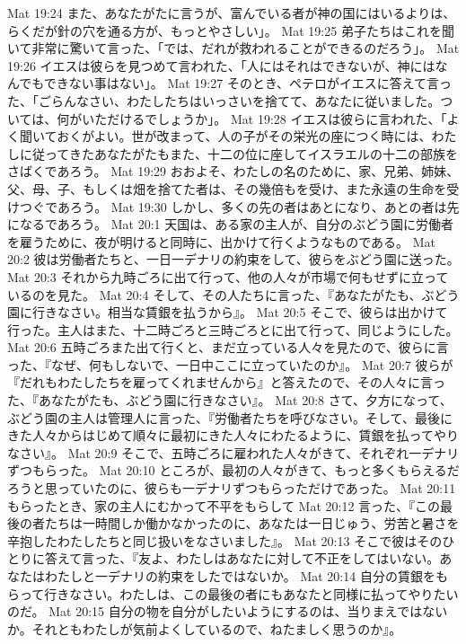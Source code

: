 Mat 19:24  また、あなたがたに言うが、富んでいる者が神の国にはいるよりは、らくだが針の穴を通る方が、もっとやさしい」。
Mat 19:25  弟子たちはこれを聞いて非常に驚いて言った、「では、だれが救われることができるのだろう」。
Mat 19:26  イエスは彼らを見つめて言われた、「人にはそれはできないが、神にはなんでもできない事はない」。
Mat 19:27  そのとき、ペテロがイエスに答えて言った、「ごらんなさい、わたしたちはいっさいを捨てて、あなたに従いました。ついては、何がいただけるでしょうか」。
Mat 19:28  イエスは彼らに言われた、「よく聞いておくがよい。世が改まって、人の子がその栄光の座につく時には、わたしに従ってきたあなたがたもまた、十二の位に座してイスラエルの十二の部族をさばくであろう。
Mat 19:29  おおよそ、わたしの名のために、家、兄弟、姉妹、父、母、子、もしくは畑を捨てた者は、その幾倍もを受け、また永遠の生命を受けつぐであろう。
Mat 19:30  しかし、多くの先の者はあとになり、あとの者は先になるであろう。
Mat 20:1  天国は、ある家の主人が、自分のぶどう園に労働者を雇うために、夜が明けると同時に、出かけて行くようなものである。
Mat 20:2  彼は労働者たちと、一日一デナリの約束をして、彼らをぶどう園に送った。
Mat 20:3  それから九時ごろに出て行って、他の人々が市場で何もせずに立っているのを見た。
Mat 20:4  そして、その人たちに言った、『あなたがたも、ぶどう園に行きなさい。相当な賃銀を払うから』。
Mat 20:5  そこで、彼らは出かけて行った。主人はまた、十二時ごろと三時ごろとに出て行って、同じようにした。
Mat 20:6  五時ごろまた出て行くと、まだ立っている人々を見たので、彼らに言った、『なぜ、何もしないで、一日中ここに立っていたのか』。
Mat 20:7  彼らが『だれもわたしたちを雇ってくれませんから』と答えたので、その人々に言った、『あなたがたも、ぶどう園に行きなさい』。
Mat 20:8  さて、夕方になって、ぶどう園の主人は管理人に言った、『労働者たちを呼びなさい。そして、最後にきた人々からはじめて順々に最初にきた人々にわたるように、賃銀を払ってやりなさい』。
Mat 20:9  そこで、五時ごろに雇われた人々がきて、それぞれ一デナリずつもらった。
Mat 20:10  ところが、最初の人々がきて、もっと多くもらえるだろうと思っていたのに、彼らも一デナリずつもらっただけであった。
Mat 20:11  もらったとき、家の主人にむかって不平をもらして
Mat 20:12  言った、『この最後の者たちは一時間しか働かなかったのに、あなたは一日じゅう、労苦と暑さを辛抱したわたしたちと同じ扱いをなさいました』。
Mat 20:13  そこで彼はそのひとりに答えて言った、『友よ、わたしはあなたに対して不正をしてはいない。あなたはわたしと一デナリの約束をしたではないか。
Mat 20:14  自分の賃銀をもらって行きなさい。わたしは、この最後の者にもあなたと同様に払ってやりたいのだ。
Mat 20:15  自分の物を自分がしたいようにするのは、当りまえではないか。それともわたしが気前よくしているので、ねたましく思うのか』。
